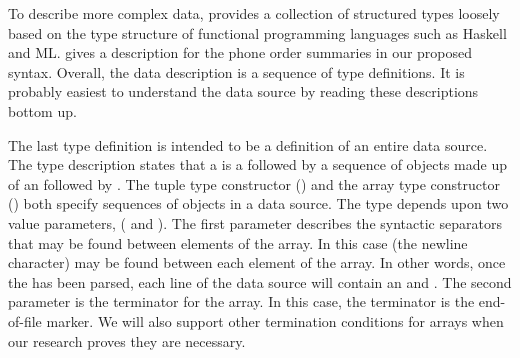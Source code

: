 \documentclass[11pt]{article}
\begin{document}
To describe more complex data, \datatype{} provides a collection of
structured types loosely based on the type structure of functional
programming languages such as Haskell and ML.  
 gives a \datatype{} description 
for the \dibbler{} phone order summaries in our
proposed syntax.  Overall, the data
description is a sequence of type definitions.
It is probably easiest to understand the data source by
reading these descriptions bottom up.

The last type definition  is intended to be
a definition of an entire \dibbler{} data source.  The
type description states that a  is a
 followed by a sequence of objects
made up of an  followed by .
The tuple type constructor () and the
array type constructor ()
both specify sequences of objects in a data source.
The  type depends upon two value parameters,
( and ).
The first parameter describes the syntactic separators 
that may be found between elements of the array.  In this
case  (the newline character) may be found between
each element of the array.  In other words, once 
the  has been parsed, each line
of the data source will contain an 
 and .  The second parameter
is the terminator for the array.  In this case,
the terminator is the end-of-file marker.  We will also
support other termination conditions for arrays when our research
proves they are necessary.

\end{document}
